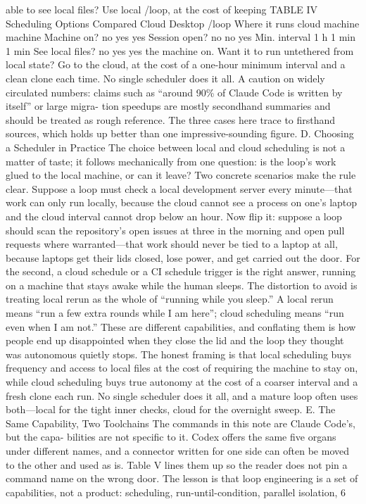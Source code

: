 \documentclass[conference]{IEEEtran}
\begin{document}
able to see local files? Use local /loop, at the cost of keeping
TABLE IV
Scheduling Options Compared
Cloud Desktop /loop
Where it runs cloud machine machine
Machine on? no yes yes
Session open? no no yes
Min. interval 1 h 1 min 1 min
See local files? no yes yes
the machine on. Want it to run untethered from local state? Go
to the cloud, at the cost of a one-hour minimum interval and a
clean clone each time. No single scheduler does it all.
A caution on widely circulated numbers: claims such as
“around 90\% of Claude Code is written by itself” or large migra-
tion speedups are mostly secondhand summaries and should be
treated as rough reference. The three cases here trace to firsthand
sources, which holds up better than one impressive-sounding
figure.
D. Choosing a Scheduler in Practice
The choice between local and cloud scheduling is not a matter
of taste; it follows mechanically from one question: is the loop’s
work glued to the local machine, or can it leave? Two concrete
scenarios make the rule clear. Suppose a loop must check a
local development server every minute—that work can only run
locally, because the cloud cannot see a process on one’s laptop
and the cloud interval cannot drop below an hour. Now flip it:
suppose a loop should scan the repository’s open issues at three
in the morning and open pull requests where warranted—that
work should never be tied to a laptop at all, because laptops get
their lids closed, lose power, and get carried out the door. For
the second, a cloud schedule or a CI schedule trigger is the right
answer, running on a machine that stays awake while the human
sleeps.
The distortion to avoid is treating local rerun as the whole of
“running while you sleep.” A local rerun means “run a few extra
rounds while I am here”; cloud scheduling means “run even
when I am not.” These are different capabilities, and conflating
them is how people end up disappointed when they close the
lid and the loop they thought was autonomous quietly stops.
The honest framing is that local scheduling buys frequency and
access to local files at the cost of requiring the machine to stay
on, while cloud scheduling buys true autonomy at the cost of a
coarser interval and a fresh clone each run. No single scheduler
does it all, and a mature loop often uses both—local for the tight
inner checks, cloud for the overnight sweep.
E. The Same Capability, Two Toolchains
The commands in this note are Claude Code’s, but the capa-
bilities are not specific to it. Codex offers the same five organs
under different names, and a connector written for one side can
often be moved to the other and used as is. Table V lines them
up so the reader does not pin a command name on the wrong
door. The lesson is that loop engineering is a set of capabilities,
not a product: scheduling, run-until-condition, parallel isolation,
6
\end{document}
